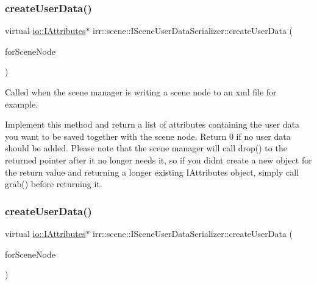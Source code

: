 \subsubsection{\texorpdfstring{create\+User\+Data()}{createUserData()}\hspace{0.1cm}{\footnotesize\ttfamily [1/2]}}
{\footnotesize\ttfamily virtual \hyperlink{classirr_1_1io_1_1IAttributes}{io\+::\+I\+Attributes}$\ast$ irr\+::scene\+::\+I\+Scene\+User\+Data\+Serializer\+::create\+User\+Data (\begin{DoxyParamCaption}\item[{\hyperlink{classirr_1_1scene_1_1ISceneNode}{I\+Scene\+Node} $\ast$}]{for\+Scene\+Node }\end{DoxyParamCaption})\hspace{0.3cm}{\ttfamily [pure virtual]}}



Called when the scene manager is writing a scene node to an xml file for example. 

Implement this method and return a list of attributes containing the user data you want to be saved together with the scene node. Return 0 if no user data should be added. Please note that the scene manager will call drop() to the returned pointer after it no longer needs it, so if you didn\textquotesingle{}t create a new object for the return value and returning a longer existing I\+Attributes object, simply call grab() before returning it. \mbox{\label{classirr_1_1scene_1_1ISceneUserDataSerializer_a8d276882257602ffc03a23a38290ea44}} 
\subsubsection{\texorpdfstring{create\+User\+Data()}{createUserData()}\hspace{0.1cm}{\footnotesize\ttfamily [2/2]}}
{\footnotesize\ttfamily virtual \hyperlink{classirr_1_1io_1_1IAttributes}{io\+::\+I\+Attributes}$\ast$ irr\+::scene\+::\+I\+Scene\+User\+Data\+Serializer\+::create\+User\+Data (\begin{DoxyParamCaption}\item[{\hyperlink{classirr_1_1scene_1_1ISceneNode}{I\+Scene\+Node} $\ast$}]{for\+Scene\+Node }\end{DoxyParamCaption})\hspace{0.3cm}{\ttfamily [pure virtual]}}




